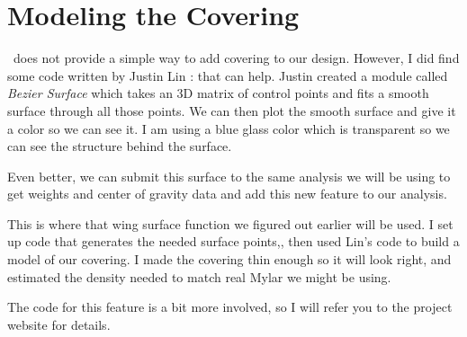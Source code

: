 \section{Modeling the Covering}

\osc\ does not provide a simple way to add covering to our design. However, I
did find some code written by Justin Lin :\cite{lin} that can help. Justin
created a module called {\it Bezier Surface} which takes an 3D matrix of control
points and fits a smooth surface through all those points. We can then plot the
smooth surface and give it a color so we can see it. I am using a blue glass
color which is transparent so we can see the structure behind the surface.

Even better, we can submit this surface to the same analysis we will be using to
get weights and center of gravity data and add this new feature to our
analysis.

This is where that wing surface function we figured out earlier  will be used.
I set up code that generates the needed surface points,, then used Lin's code to
build a model of our covering. I made the covering thin enough so it will look
right, and estimated the density needed to match real Mylar we might be using.

The code for this feature is a bit more involved, so I will refer you to the
project website for details.


